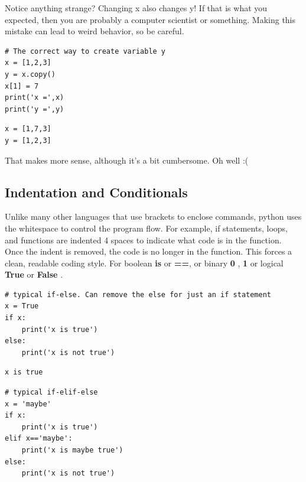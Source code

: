 \documentclass[%
oneside,                 %
final,                   %
10pt]{article}
\begin{document}

Notice anything strange? Changing x also changes y! If that is what you expected, then you are probably a computer scientist or something. Making this mistake can lead to weird behavior, so be careful.


\begin{verbatim}
# The correct way to create variable y
x = [1,2,3]
y = x.copy()
x[1] = 7
print('x =',x)
print('y =',y)
\end{verbatim}

\begin{verbatim}
x = [1,7,3]
y = [1,2,3]
\end{verbatim}

That makes more sense, although it's a bit cumbersome. Oh well :(

\subsection{Indentation and Conditionals}

Unlike many other languages that use brackets to enclose commands, python uses the whitespace to control the program flow. For example, if statements, loops, and functions are indented 4 spaces to indicate what code is in the function. Once the indent is removed, the code is no longer in the function. This forces a clean, readable coding style. For boolean \textbf{is} or \textbf{==}, or binary \textbf{0} , \textbf{1} or logical \textbf{True} or \textbf{False} .

\begin{verbatim}
# typical if-else. Can remove the else for just an if statement
x = True
if x:
    print('x is true')
else:
    print('x is not true')
\end{verbatim}

\begin{verbatim}
x is true
\end{verbatim}

\begin{verbatim}
# typical if-elif-else
x = 'maybe'
if x:
    print('x is true')
elif x=='maybe':
    print('x is maybe true')
else:
    print('x is not true')
\end{verbatim}
\end{document}
